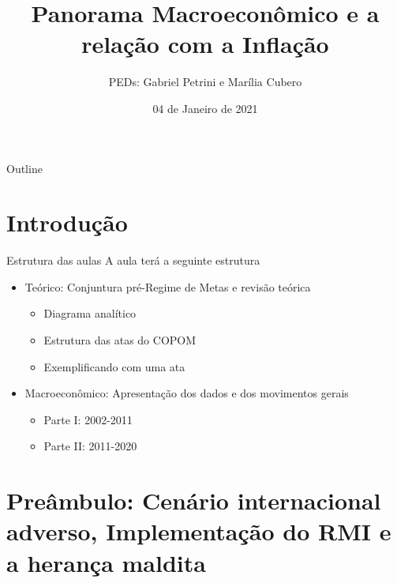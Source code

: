 \documentclass[presentation]{beamer}
\author{PEDs: Gabriel Petrini e Marília Cubero}
\date{04 de Janeiro de 2021}
\title{Panorama Macroeconômico e a relação com a Inflação}
\begin{document}
\maketitle
\begin{frame}{Outline}
\tableofcontents
\end{frame}

\section{Introdução}
\label{sec:org4c0dcb5}

\begin{frame}[label={sec:orgfc2e8c2}]{Estrutura das aulas}
A aula terá a seguinte estrutura
\begin{itemize}
\item \alert{Teórico:} Conjuntura pré-Regime de Metas e revisão teórica
\begin{itemize}
\item Diagrama analítico
\item Estrutura das atas do COPOM
\item Exemplificando com uma ata
\end{itemize}
\item \alert{Macroeconômico:} Apresentação dos dados e dos movimentos gerais
\begin{itemize}
\item Parte I: 2002-2011
\item Parte II: 2011-2020
\end{itemize}
\end{itemize}
\end{frame}


\section{Preâmbulo: Cenário internacional adverso, Implementação do RMI e a herança maldita}
\label{sec:orgd5908fa}
\end{document}
